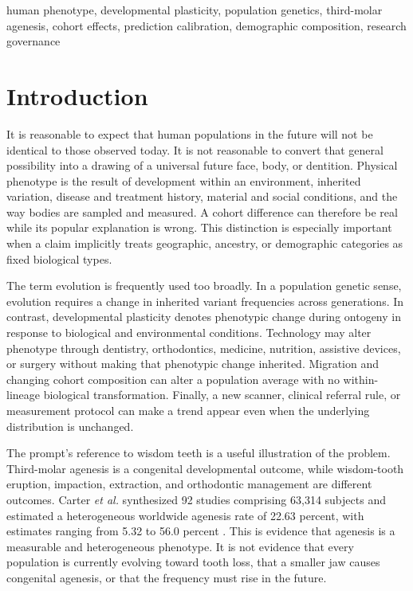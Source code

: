 \documentclass[conference]{IEEEtran}
\begin{document}
\begin{IEEEkeywords}
human phenotype, developmental plasticity, population genetics, third-molar
agenesis, cohort effects, prediction calibration, demographic composition,
research governance
\end{IEEEkeywords}

\section{Introduction}

It is reasonable to expect that human populations in the future will not be
identical to those observed today. It is not reasonable to convert that
general possibility into a drawing of a universal future face, body, or
dentition. Physical phenotype is the result of development within an
environment, inherited variation, disease and treatment history, material and
social conditions, and the way bodies are sampled and measured. A cohort
difference can therefore be real while its popular explanation is wrong. This
distinction is especially important when a claim implicitly treats geographic,
ancestry, or demographic categories as fixed biological types.

The term evolution is frequently used too broadly. In a population genetic
sense, evolution requires a change in inherited variant frequencies across
generations. In contrast, developmental plasticity denotes phenotypic change
during ontogeny in response to biological and environmental conditions.
Technology may alter phenotype through dentistry, orthodontics, medicine,
nutrition, assistive devices, or surgery without making that phenotypic change
inherited. Migration and changing cohort composition can alter a population
average with no within-lineage biological transformation. Finally, a new
scanner, clinical referral rule, or measurement protocol can make a trend
appear even when the underlying distribution is unchanged.

The prompt's reference to wisdom teeth is a useful illustration of the
problem. Third-molar agenesis is a congenital developmental outcome, while
wisdom-tooth eruption, impaction, extraction, and orthodontic management are
different outcomes. Carter \emph{et al.} synthesized 92 studies comprising
63,314 subjects and estimated a heterogeneous worldwide agenesis rate of
22.63 percent, with estimates ranging from 5.32 to 56.0 percent
\cite{carter2015}. This is evidence that agenesis is a measurable and
heterogeneous phenotype. It is not evidence that every population is
currently evolving toward tooth loss, that a smaller jaw causes congenital
agenesis, or that the frequency must rise in the future.
\end{document}
